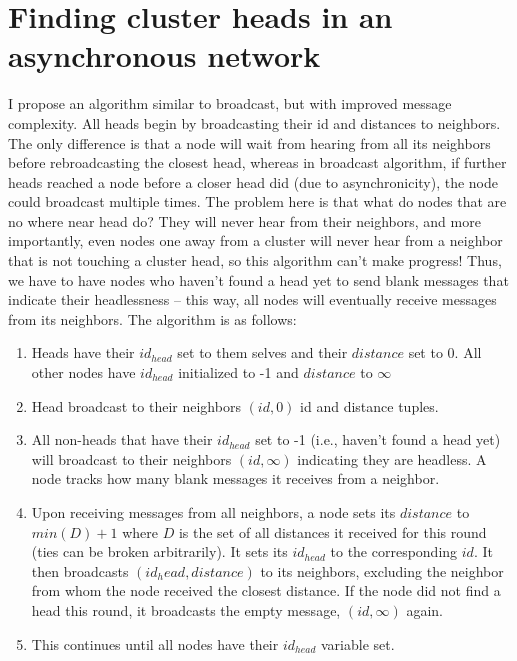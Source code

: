 \documentclass{article}
\begin{document}
\section{Finding cluster heads in an asynchronous network}
\label{problem1.2}
I propose an algorithm similar to broadcast, but with improved message complexity. All heads begin by broadcasting their id and distances to neighbors. The only difference is that
a node will wait from hearing from all its neighbors before rebroadcasting the closest head, whereas in broadcast algorithm, if further heads reached a node before a closer head
did (due to asynchronicity), the node could broadcast multiple times.
The problem here is that what do nodes that are no where near head do? They will never hear from their neighbors, and more importantly, even nodes one away from a cluster will
never hear from a neighbor that is not touching a cluster head, so this algorithm can't make progress! Thus, we have to have nodes who haven't found a head yet to send blank
messages that indicate their headlessness -- this way, all nodes will eventually receive messages from its neighbors.  The algorithm is as follows:


\begin{enumerate}
\item Heads have their $id_{head}$ set to them selves and their $distance$ set to 0. All other nodes have $id_{head}$ initialized to -1 and $distance$ to $\infty$
\item Head broadcast to their neighbors $(id, 0)$ id and distance tuples.
\item All non-heads that have their $id_{head}$ set to -1 (i.e., haven't found a head yet) will broadcast to their neighbors $(id, \infty)$ indicating they are headless. A node tracks how many blank messages it receives from a neighbor.
\item Upon receiving messages from all neighbors, a node sets its $distance$  to $min(D)+1$ where $D$ is the set of all distances it received for this round (ties can be broken
arbitrarily). It sets its $id_{head}$ to the
corresponding $id$. It then broadcasts $(id_head, distance)$ to its neighbors, excluding the neighbor from whom the node received the closest distance. If the node did not find a head this round, it broadcasts the empty message, $(id, \infty)$ again.
\item This continues until all nodes have their $id_{head}$ variable set.
\end{enumerate}
\end{document}
